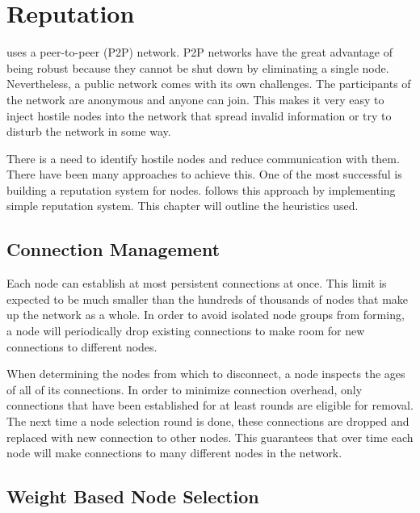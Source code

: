 \section{Reputation}
\label{sec:reputation}


\codenamechapterfirstword uses a peer-to-peer (P2P) network.
P2P networks have the great advantage of being robust because they cannot be shut down by eliminating a single node.
Nevertheless, a public network comes with its own challenges.
The participants of the network are anonymous and anyone can join.
This makes it very easy to inject hostile nodes into the network that spread invalid information or try to disturb the network in some way.

There is a need to identify hostile nodes and reduce communication with them.
There have been many approaches to achieve this.
One of the most successful is building a reputation system for nodes.
\codenamespace follows this approach by implementing simple reputation system.
This chapter will outline the heuristics used.

\subsection{Connection Management}
\label{sec:reputation:ConnectionManagement}

Each node can establish at most  persistent connections at once.
This limit is expected to be much smaller than the hundreds of thousands of nodes that make up the network as a whole.
In order to avoid isolated node groups from forming, a node will periodically drop existing connections to make room for new connections to different nodes.

When determining the nodes from which to disconnect, a node inspects the ages of all of its connections.
In order to minimize connection overhead, only connections that have been established for at least  rounds are eligible for removal.
The next time a node selection round is done, these connections are dropped and replaced with new connection to other nodes.
This guarantees that over time each node will make connections to many different nodes in the network.

\subsection{Weight Based Node Selection}
\label{sec:reputation:NodeSelection}

